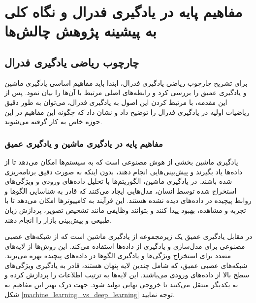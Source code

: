 \chapter{مفاهیم پایه در یادگیری فدرال و نگاه کلی به پیشینه پژوهش چالش‌ها}

\section{چارچوب ریاضی یادگیری فدرال}
برای تشریح چارچوب ریاضی یادگیری فدرال، ابتدا باید مفاهیم اساسی یادگیری ماشین و یادگیری عمیق را بررسی کرد و رابطه‌های اصلی مرتبط با آن‌ها را بیان نمود. پس از این مقدمه، با مرتبط کردن این اصول به یادگیری فدرال، می‌توان به طور دقیق ریاضیات اولیه در یادگیری فدرال را توضیح داد و نشان داد که چگونه این مفاهیم در این حوزه خاص به کار گرفته می‌شوند.

\subsection{مفاهیم پایه در یادگیری ماشین و یادگیری عمیق}
یادگیری ماشین بخشی از هوش مصنوعی است که به سیستم‌ها امکان می‌دهد تا از داده‌ها یاد بگیرند و پیش‌بینی‌هایی انجام دهند، بدون اینکه به صورت دقیق برنامه‌ریزی شده باشند. در یادگیری ماشین، الگوریتم‌ها با تحلیل داده‌های ورودی و ویژگی‌های استخراج شده توسط انسان، مدل‌هایی ایجاد می‌کنند که قادر به شناسایی الگوها و روابط پیچیده در داده‌های دیده نشده هستند. این فرآیند به کامپیوترها امکان می‌دهد تا با تجربه و مشاهده، بهبود پیدا کنند و بتوانند وظایفی مانند تشخیص تصویر، پردازش زبان طبیعی و پیش‌بینی بازار را انجام دهند.

در مقابل یادگیری عمیق یک زیرمجموعه از یادگیری ماشین است که از شبکه‌های عصبی مصنوعی برای مدل‌سازی و یادگیری از داده‌ها استفاده می‌کند. این روش‌ها از لایه‌های متعدد برای استخراج ویژگی‌ها و یادگیری الگوها در داده‌های پیچیده بهره می‌برند. شبکه‌های عصبی عمیق، که شامل چندین لایه پنهان%
هستند، قادر به یادگیری ویژگی‌های سطح بالا از داده‌های ورودی می‌باشند. این لایه‌ها به ترتیب اطلاعات را پردازش کرده و به یکدیگر منتقل می‌کنند تا خروجی نهایی تولید شود. جهت درک بهتر این مفاهیم به شکل
\ref{machine_learning_vs_deep_learning}
توجه نمایید.


